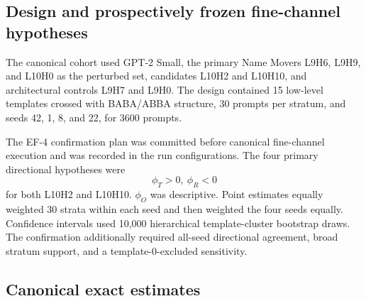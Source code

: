 \documentclass[pdflatex,sn-mathphys-ay]{sn-jnl}
\begin{document}
\subsection{Design and prospectively frozen fine-channel hypotheses}

The canonical cohort used GPT-2 Small, the primary Name Movers L9H6, L9H9, and
L10H0 as the perturbed set, candidates L10H2 and L10H10, and architectural controls
L9H7 and L9H0. The design contained 15 low-level templates crossed with BABA/ABBA
structure, 30 prompts per stratum, and seeds 42, 1, 8, and 22, for 3600 prompts.

The EF-4 confirmation plan was committed before canonical fine-channel execution
and was recorded in the run configurations. The four primary directional hypotheses
were
\[
\phi_T>0,\ \phi_R<0
\]
for both L10H2 and L10H10. $\phi_O$ was descriptive. Point estimates equally
weighted 30 strata within each seed and then weighted the four seeds equally.
Confidence intervals used 10,000 hierarchical template-cluster bootstrap draws.
The confirmation additionally required all-seed directional agreement, broad
stratum support, and a template-0-excluded sensitivity.

\subsection{Canonical exact estimates}
\end{document}
